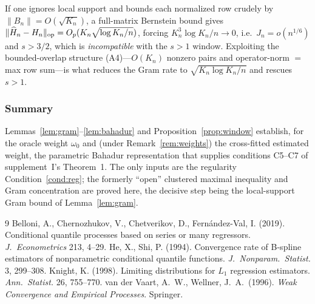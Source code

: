 \begin{remark}\label{rem:essential}
If one ignores local support and bounds each normalized row crudely by
$\|B_n\|=O(\sqrt{K_n})$, a full-matrix Bernstein bound gives
$\|\widehat H_n-H_n\|_{\mathrm{op}}=O_p(K_n\sqrt{\log K_n/n})$, forcing
$K_n^3\log K_n/n\to0$, i.e.\ $J_n=o(n^{1/6})$ and $s>3/2$, which is
\emph{incompatible} with the $s>1$ window. Exploiting the bounded-overlap
structure (A4)---$O(K_n)$ nonzero pairs and operator-norm $=$ max row sum---is
what reduces the Gram rate to $\sqrt{K_n\log K_n/n}$ and rescues $s>1$.
\end{remark}

\subsubsection{Summary}
Lemmas~\ref{lem:gram}--\ref{lem:bahadur} and Proposition~\ref{prop:window}
establish, for the oracle weight $\omega_0$ and (under
Remark~\ref{rem:weights}) the cross-fitted estimated weight, the parametric
Bahadur representation that supplies conditions C5--C7 of supplement~I's
Theorem~1. The only inputs are the regularity Condition~\ref{cond:reg}; the
formerly ``open'' clustered maximal inequality and Gram concentration are proved
here, the decisive step being the local-support Gram bound of
Lemma~\ref{lem:gram}.

\begin{thebibliography}{9}
 Belloni, A., Chernozhukov, V.,
Chetverikov, D., Fern\'andez-Val, I. (2019). Conditional quantile processes
based on series or many regressors. \emph{J.\ Econometrics} 213, 4--29.
 He, X., Shi, P. (1994). Convergence rate of
B-spline estimators of nonparametric conditional quantile functions.
\emph{J.\ Nonparam.\ Statist.} 3, 299--308.
 Knight, K. (1998). Limiting distributions for
$L_1$ regression estimators. \emph{Ann.\ Statist.} 26, 755--770.
 van der Vaart, A.\ W.,
Wellner, J.\ A.\ (1996). \emph{Weak Convergence and Empirical Processes}.
Springer.
\end{thebibliography}
